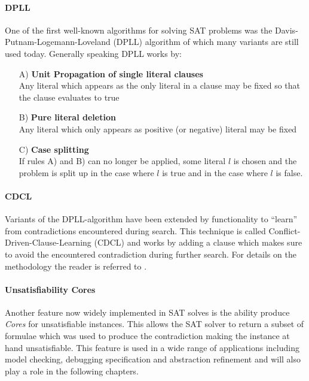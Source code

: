 \paragraph{DPLL} One of the first well-known algorithms for solving SAT problems was the Davis\hyp{}Putnam\hyp{}Logemann\hyp{}Loveland (DPLL) algorithm \cite{DPLL} of which many variants are still used today.
Generally speaking DPLL works by:
\begin{itemize}
    \item[A)]   \textbf{Unit Propagation of single literal clauses}\\
                Any literal which appears as the only literal in a clause may be fixed so that the clause evaluates to true
    \item[B)]   \textbf{Pure literal deletion}\\
                Any literal which only appears as positive (or negative) literal may be fixed
    \item[C)]   \textbf{Case splitting}\\
                If rules A) and B) can no longer be applied, some literal $l$ is chosen and the problem is split up in the case where $l$ is true and in the case where $l$ is false.
\end{itemize}

\paragraph{CDCL} Variants of the DPLL-algorithm have been extended by functionality to \enquote{learn} from contradictions encountered during search. This technique is called Conflict\hyp{}Driven\hyp{}Clause\hyp{}Learning (CDCL) and works by adding a clause which makes sure to avoid the encountered contradiction during further search. For details on the methodology the reader is referred to \cite{Grasp}.

\paragraph{Unsatisfiability Cores}
Another feature now widely implemented in SAT solves is the ability produce \textit{Cores} for unsatisfiable instances. This allows the SAT solver to return a subset of formulae which was used to  produce the contradiction making the instance at hand unsatisfiable. This feature is used in a wide range of applications including model checking, debugging specification and abstraction refinement \cite{Marques-Silva-PropositionalSATSolving} and will also play a role in the following chapters.

